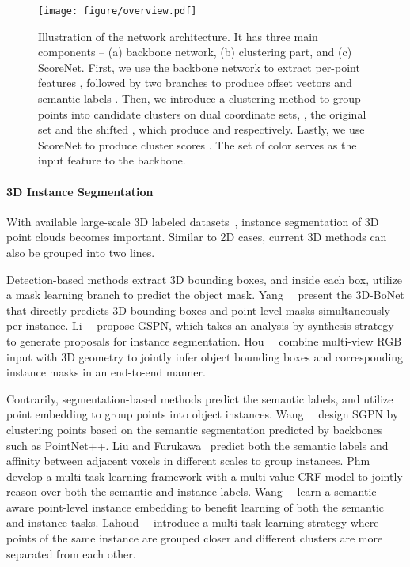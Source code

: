 \documentclass[10pt,twocolumn,letterpaper]{article}
\begin{document}
\begin{figure*}
	\begin{center}
		\texttt{[image: figure/overview.pdf]}
	\end{center}
	\vspace{-4mm}
	\caption{Illustration of the network architecture. It has three main components -- (a) backbone network, (b) clustering part, and (c) ScoreNet.
		First, we use the backbone network to extract per-point features , followed by two branches to produce offset vectors  and semantic labels . 
		Then, we introduce a clustering method to group points into candidate clusters on dual coordinate sets, \ie, the original set  and the shifted , which produce  and  respectively. 
		Lastly, we use ScoreNet to produce cluster scores . The set of color  serves as the input feature to the backbone.  \vspace{-1mm}}
	\label{fig:overview}
	
\end{figure*}

\vspace*{-3mm}
\paragraph{3D Instance Segmentation}
With available large-scale 3D labeled datasets~\cite{dai2017scannet,armeni2016s3dis}, instance segmentation of 3D point clouds becomes important. Similar to 2D cases, current 3D methods can also be grouped into two lines.

Detection-based methods extract 3D bounding boxes, and inside each box, utilize a mask learning branch to predict the object mask. Yang~\etal~\cite{yang2019learning} present the 3D-BoNet that directly predicts 3D bounding boxes and point-level masks simultaneously per instance.
Li~\etal~\cite{li2019GSPN} propose GSPN, which takes an analysis-by-synthesis strategy to generate proposals for instance segmentation.
Hou~\etal~\cite{hou20193d} combine multi-view RGB input with 3D geometry to jointly infer object bounding boxes and corresponding instance masks in an end-to-end manner.

Contrarily, segmentation-based methods predict the semantic labels, and utilize point embedding to group points into object instances.
Wang~\etal~\cite{wang2018sgpn} design SGPN by clustering points based on the semantic segmentation predicted by backbones such as PointNet++.
Liu and Furukawa~\cite{liu2019masc} predict both the semantic labels and affinity between adjacent voxels in different scales to group instances.
Phm~\etal~\cite{pham2019jsis3d} develop a multi-task learning framework with a multi-value CRF model to jointly reason over both the semantic and instance labels.
Wang~\etal~\cite{wang2019associatively} learn a semantic-aware point-level instance embedding to benefit learning of both the semantic and instance tasks.
Lahoud~\etal~\cite{lahoud20193d} introduce a
multi-task learning strategy where points of the same instance are grouped closer and different clusters are more separated from each other.
\end{document}
